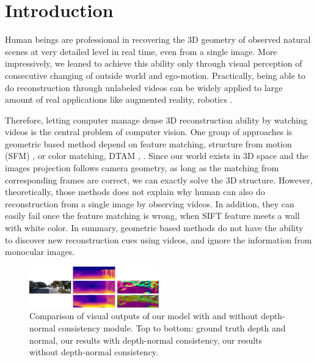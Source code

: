 \section{Introduction}
\label{sec:intro}
Human beings are professional in recovering the 3D geometry of observed natural scenes at very detailed level in real time, even from a single image. 
More impressively, we leaned to achieve this ability only through visual perception of consecutive changing of outside world and ego-motion. 
Practically, being able to do reconstruction through unlabeled videos can be widely applied to large amount of real applications like augmented reality, robotics \etc.

Therefore, letting computer manage dense 3D reconstruction ability by watching videos is the central problem of computer vision. 
One group of approaches is geometric based method depend on feature matching, \eg structure from motion (SFM) \cite{wu2011visualsfm} \etc, or color matching, \eg DTAM \cite{NewcombeLD11}, \etc.  Since our world exists in 3D space and the images projection follows camera geometry, as long as the matching from corresponding frames are correct, we can exactly solve the 3D structure. 
However, theoretically, those methods does not explain why human can also do reconstruction from a single image by observing videos. In addition, they can easily fail once the feature matching is wrong, \eg when SIFT \cite{lowe2004distinctive}  feature meets a wall with white color. 
In summary, geometric based methods do not have the ability to discover new reconstruction cues using videos, and ignore the information from monocular images.

\begin{figure}
\centering
\includegraphics[width=0.5\textwidth, height=0.25\textwidth]{figures/visual_comparison.pdf}
\caption{Comparison of visual outputs of our model with and without depth-normal consistency module. Top to bottom: ground truth depth and normal, our results with depth-normal consistency, our results without depth-normal consistency.}
\label{fig:visual_comparison}
\end{figure}

